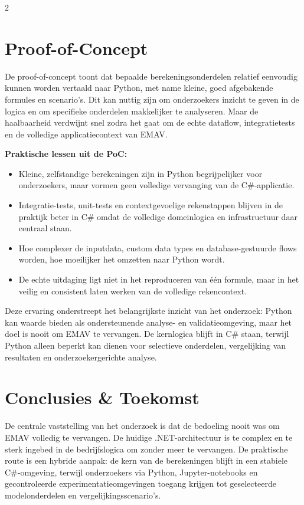 \documentclass[a0,portrait]{hogent-poster}
\begin{document}
\begin{multicols}{2}
\section{Proof-of-Concept}

De proof-of-concept toont dat bepaalde berekeningsonderdelen relatief eenvoudig kunnen worden vertaald naar Python, met name kleine, goed afgebakende formules en scenario's. Dit kan nuttig zijn om onderzoekers inzicht te geven in de logica en om specifieke onderdelen makkelijker te analyseren. Maar de haalbaarheid verdwijnt snel zodra het gaat om de echte dataflow, integratietests en de volledige applicatiecontext van EMAV.

\textbf{Praktische lessen uit de PoC:}
\begin{itemize}
    \item Kleine, zelfstandige berekeningen zijn in Python begrijpelijker voor onderzoekers, maar vormen geen volledige vervanging van de C\#-applicatie.
    \item Integratie-tests, unit-tests en contextgevoelige rekenstappen blijven in de praktijk beter in C\# omdat de volledige domeinlogica en infrastructuur daar centraal staan.
    \item Hoe complexer de inputdata, custom data types en database-gestuurde flows worden, hoe moeilijker het omzetten naar Python wordt.
    \item De echte uitdaging ligt niet in het reproduceren van één formule, maar in het veilig en consistent laten werken van de volledige rekencontext.
\end{itemize}

Deze ervaring onderstreept het belangrijkste inzicht van het onderzoek: Python kan waarde bieden als ondersteunende analyse- en validatieomgeving, maar het doel is nooit om EMAV te vervangen. De kernlogica blijft in C\# staan, terwijl Python alleen beperkt kan dienen voor selectieve onderdelen, vergelijking van resultaten en onderzoekergerichte analyse.

\section{Conclusies \& Toekomst}

De centrale vaststelling van het onderzoek is dat de bedoeling nooit was om EMAV volledig te vervangen. De huidige .NET-architectuur is te complex en te sterk ingebed in de bedrijfslogica om zonder meer te vervangen. De praktische route is een hybride aanpak: de kern van de berekeningen blijft in een stabiele C\#-omgeving, terwijl onderzoekers via Python, Jupyter-notebooks en gecontroleerde experimentatieomgevingen toegang krijgen tot geselecteerde modelonderdelen en vergelijkingsscenario's.


\end{multicols}
\end{document}

